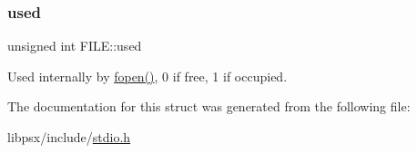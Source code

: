 \subsubsection{\texorpdfstring{used}{used}}
{\footnotesize\ttfamily unsigned int F\+I\+L\+E\+::used}



Used internally by \hyperlink{stdio_8h_a61171f829f6067fa0c9936fc4e0cbb82}{fopen()}, 0 if free, 1 if occupied. 



The documentation for this struct was generated from the following file\+:\begin{DoxyCompactItemize}
\item 
libpsx/include/\hyperlink{stdio_8h}{stdio.\+h}\end{DoxyCompactItemize}
